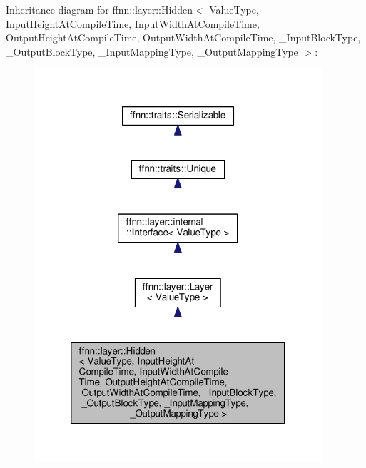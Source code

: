 Inheritance diagram for ffnn\-:\-:layer\-:\-:Hidden$<$ Value\-Type, Input\-Height\-At\-Compile\-Time, Input\-Width\-At\-Compile\-Time, Output\-Height\-At\-Compile\-Time, Output\-Width\-At\-Compile\-Time, \-\_\-\-Input\-Block\-Type, \-\_\-\-Output\-Block\-Type, \-\_\-\-Input\-Mapping\-Type, \-\_\-\-Output\-Mapping\-Type $>$\-:\nopagebreak
\begin{figure}[H]
\begin{center}
\leavevmode
\includegraphics[width=302pt]{classffnn_1_1layer_1_1_hidden__inherit__graph}
\end{center}
\end{figure}


